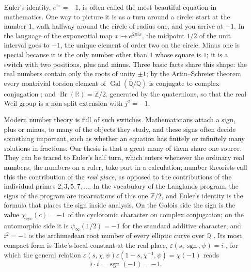 \documentclass[11pt]{amsart}
\numberwithin{equation}{section}
\newcommand{\Q}{\mathbb{Q}}
\newcommand{\R}{\mathbb{R}}
\newcommand{\Z}{\mathbb{Z}}
\newcommand{\Gal}{\operatorname{Gal}}
\newcommand{\Br}{\operatorname{Br}}
\newcommand{\sgn}{\operatorname{sgn}}
\newcommand{\cyc}{\mathrm{cyc}}
\begin{document}
Euler's identity, $e^{i\pi}=-1$, is often called the most beautiful equation in mathematics. One way to picture it is as a turn around a circle: start at the number $1$, walk halfway around the circle of radius one, and you arrive at $-1$. In the language of the exponential map $x\mapsto e^{2\pi i x}$, the midpoint $1/2$ of the unit interval goes to $-1$, the unique element of order two on the circle. Minus one is special because it is the only number other than $1$ whose square is $1$; it is a switch with two positions, plus and minus. Three basic facts share this shape: the real numbers contain only the roots of unity $\pm1$; by the Artin--Schreier theorem every nontrivial torsion element of $\Gal(\overline{\Q}/\Q)$ is conjugate to complex conjugation \cite{ArtinSchreier1927}; and $\Br(\R)=\Z/2$, generated by the quaternions, so that the real Weil group is a non-split extension with $j^2=-1$.

Modern number theory is full of such switches. Mathematicians attach a sign, plus or minus, to many of the objects they study, and these signs often decide something important, such as whether an equation has finitely or infinitely many solutions in fractions. Our thesis is that a great many of them share one source. They can be traced to Euler's half turn, which enters whenever the ordinary real numbers, the numbers on a ruler, take part in a calculation; number theorists call this the contribution of the \emph{real place}, as opposed to the contributions of the individual primes $2,3,5,7,\dots$. In the vocabulary of the Langlands program, the signs of the program are incarnations of this one $\Z/2$, and Euler's identity is the formula that places the sign inside analysis. On the Galois side the sign is the value $\chi_\cyc(c)=-1$ of the cyclotomic character on complex conjugation; on the automorphic side it is $\psi_\infty(1/2)=-1$ for the standard additive character, and $i^2=-1$ is the archimedean root number of every elliptic curve over $\Q$ \cite{Deligne1973}. Its most compact form is Tate's local constant at the real place, $\varepsilon(s,\sgn,\psi)=i$ \cite{Tate1950}, for which the general relation $\varepsilon(s,\chi,\psi)\varepsilon(1-s,\chi^{-1},\psi)=\chi(-1)$ reads
\begin{equation}\label{eq:thesis}
i\cdot i=\sgn(-1)=-1 .
\end{equation}
\end{document}
